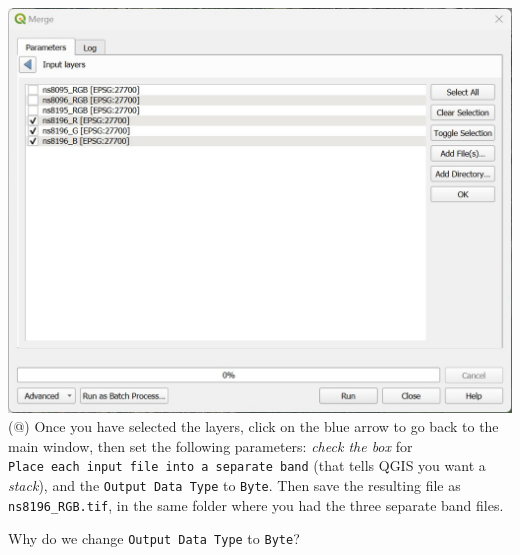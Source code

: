 \documentclass[
  letterpaper,
  DIV=11,
  numbers=noendperiod]{scrreprt}
\begin{document}
\includegraphics{images/lab_6/lab_6_fig7_merge_layers.jpg} (@) Once you
have selected the layers, click on the blue arrow to go back to the main
window, then set the following parameters: \emph{check the box} for
\texttt{Place\ each\ input\ file\ into\ a\ separate\ band} (that tells
QGIS you want a \emph{stack}), and the \texttt{Output\ Data\ Type} to
\texttt{Byte}. Then save the resulting file as \texttt{ns8196\_RGB.tif},
in the same folder where you had the three separate band files.

\begin{tcolorbox}[enhanced jigsaw, coltitle=black, toprule=.15mm, breakable, opacitybacktitle=0.6, left=2mm, colback=white, leftrule=.75mm, rightrule=.15mm, colbacktitle=quarto-callout-important-color!10!white, toptitle=1mm, titlerule=0mm, colframe=quarto-callout-important-color-frame, arc=.35mm, bottomtitle=1mm, opacityback=0, bottomrule=.15mm, title=\textcolor{quarto-callout-important-color}{\faExclamation}\hspace{0.5em}{Stop and Think}]

Why do we change \texttt{Output\ Data\ Type} to \texttt{Byte}?

\end{tcolorbox}
\end{document}
